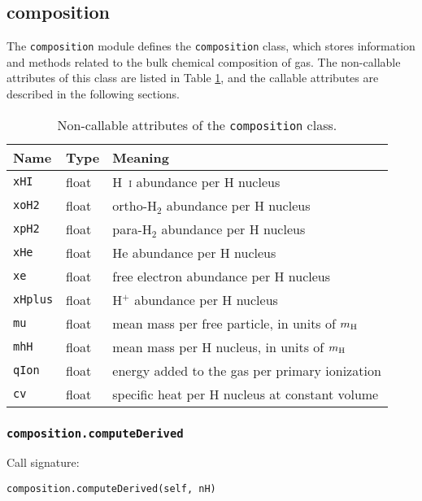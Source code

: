 \documentclass[12pt]{article}
\begin{document}
\clearpage

\subsection{composition}
\label{sec:comp}

The \verb=composition= module defines the \verb=composition= class, which stores information and methods related to the bulk chemical composition of gas. The non-callable attributes of this class are listed in Table \ref{tab:comp}, and the callable attributes are described in the following sections.

\begin{table}
\begin{center}
\begin{tabular}{lll}
\hline\hline
Name & Type & Meaning \\
\hline\hline
\texttt{xHI} & float & H~\textsc{i} abundance per H nucleus \\
\texttt{xoH2} & float & ortho-H$_2$ abundance per H nucleus \\
\texttt{xpH2} & float & para-H$_2$ abundance per H nucleus \\
\texttt{xHe} & float & He abundance per H nucleus \\
\texttt{xe} & float & free electron abundance per H nucleus \\
\texttt{xHplus} & float & H$^+$ abundance per H nucleus \\
\texttt{mu} & float & mean mass per free particle, in units of $m_{\rm H}$ \\
\texttt{mhH} & float & mean mass per H nucleus, in units of $m_{\rm H}$ \\
\texttt{qIon} & float & energy added to the gas per primary ionization \\
\texttt{cv} & float & specific heat per H nucleus at constant volume \\
\hline
\end{tabular}
\caption{
\label{tab:comp}
Non-callable attributes of the \texttt{composition} class.
}
\end{center}
\end{table}

\subsubsection{\texttt{composition.computeDerived}}

Call signature:

\begin{verbatim}
composition.computeDerived(self, nH)
\end{verbatim}
\end{document}
